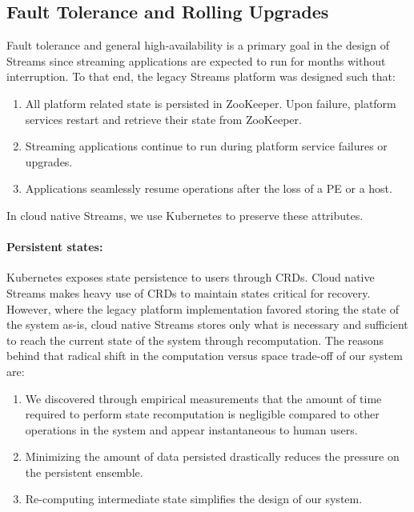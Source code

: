 \subsection{Fault Tolerance and Rolling Upgrades}

Fault tolerance and general high-availability is a primary goal in the design of
Streams since streaming applications are expected to run for months without
interruption. To that end, the legacy Streams platform was designed such that:

\begin{enumerate}
    \item All platform related state is persisted in ZooKeeper. Upon failure, 
        platform services restart and retrieve their state from ZooKeeper.
    \item Streaming applications continue to run during platform service
        failures or upgrades.
    \item Applications seamlessly resume operations after the loss of a
        PE or a host.
\end{enumerate}

In cloud native Streams, we use Kubernetes to preserve
these attributes.

\paragraph{Persistent states:} Kubernetes exposes state persistence to users
through CRDs. Cloud native Streams makes heavy use of CRDs 
to maintain states critical for recovery. However, where the legacy
platform implementation favored storing the state of the system as-is,
cloud native Streams stores only what is necessary and sufficient
to reach the current state of the system through recomputation. The reasons
behind that radical shift in the computation versus space trade-off of
our system are:

\begin{enumerate}
    \item We discovered through empirical measurements that the
        amount of time required to perform state recomputation is negligible
        compared to other operations in the system and appear instantaneous to
        human users.
    \item Minimizing the amount of data persisted drastically reduces the
        pressure on the persistent ensemble.
    \item Re-computing intermediate state simplifies the design of our system.
\end{enumerate}

